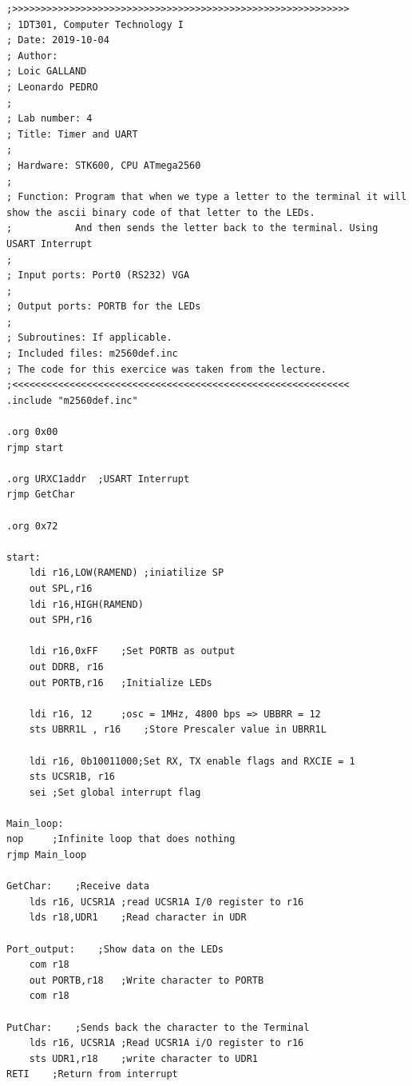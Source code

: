 \documentclass[a4paper,12pt]{article}
\begin{document}
\lstset{style=Asm}
\begin{lstlisting}
;>>>>>>>>>>>>>>>>>>>>>>>>>>>>>>>>>>>>>>>>>>>>>>>>>>>>>>>>>>>
; 1DT301, Computer Technology I
; Date: 2019-10-04
; Author:
; Loic GALLAND
; Leonardo PEDRO
;
; Lab number: 4
; Title: Timer and UART
;
; Hardware: STK600, CPU ATmega2560
;
; Function: Program that when we type a letter to the terminal it will show the ascii binary code of that letter to the LEDs.
;			And then sends the letter back to the terminal. Using USART Interrupt
;
; Input ports: Port0 (RS232) VGA 
;
; Output ports: PORTB for the LEDs 
;
; Subroutines: If applicable.
; Included files: m2560def.inc
; The code for this exercice was taken from the lecture.
;<<<<<<<<<<<<<<<<<<<<<<<<<<<<<<<<<<<<<<<<<<<<<<<<<<<<<<<<<<<
.include "m2560def.inc"

.org 0x00
rjmp start

.org URXC1addr	;USART Interrupt
rjmp GetChar

.org 0x72

start:
	ldi r16,LOW(RAMEND)	;iniatilize SP
	out SPL,r16
	ldi r16,HIGH(RAMEND)
	out SPH,r16

	ldi r16,0xFF	;Set PORTB as output
	out DDRB, r16
	out PORTB,r16	;Initialize LEDs

	ldi r16, 12		;osc = 1MHz, 4800 bps => UBBRR = 12
	sts UBRR1L , r16	;Store Prescaler value in UBRR1L

	ldi r16, 0b10011000;Set RX, TX enable flags and RXCIE = 1
	sts UCSR1B, r16
	sei	;Set global interrupt flag

Main_loop:
nop		;Infinite loop that does nothing
rjmp Main_loop

GetChar:	;Receive data
	lds r16, UCSR1A	;read UCSR1A I/0 register to r16
	lds r18,UDR1	;Read character in UDR

Port_output:	;Show data on the LEDs
	com r18
	out PORTB,r18	;Write character to PORTB 
	com r18

PutChar:	;Sends back the character to the Terminal
	lds r16, UCSR1A	;Read UCSR1A i/O register to r16
	sts UDR1,r18	;write character to UDR1
RETI	;Return from interrupt
\end{lstlisting}
\end{document}
